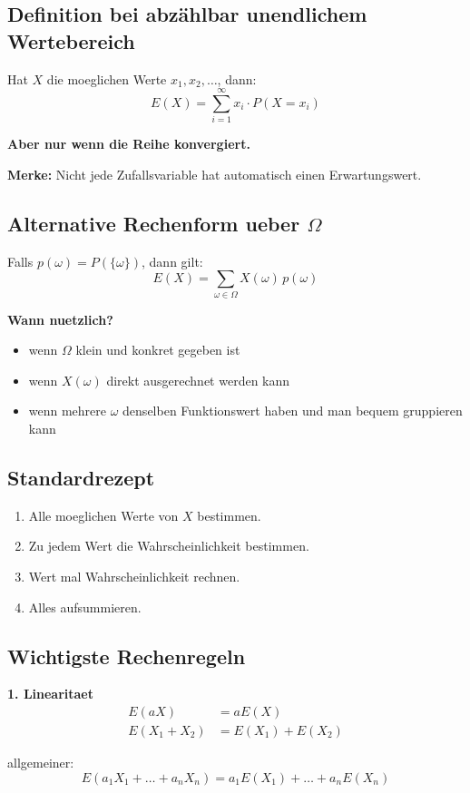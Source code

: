 \documentclass[a4paper,11pt]{article}
\begin{document}
\subsection{Definition bei abz\"ahlbar unendlichem Wertebereich}
Hat $X$ die moeglichen Werte $x_1,x_2,\dots$, dann:
\[
E(X)=\sum_{i=1}^\infty x_i \cdot P(X=x_i)
\]

\textbf{Aber nur wenn die Reihe konvergiert.}

\textbf{Merke:}
Nicht jede Zufallsvariable hat automatisch einen Erwartungswert.

\subsection{Alternative Rechenform ueber $\Omega$}
Falls $p(\omega)=P(\{\omega\})$, dann gilt:
\[
E(X)=\sum_{\omega \in \Omega} X(\omega)\,p(\omega)
\]

\textbf{Wann nuetzlich?}
\begin{itemize}
  \item wenn $\Omega$ klein und konkret gegeben ist
  \item wenn $X(\omega)$ direkt ausgerechnet werden kann
  \item wenn mehrere $\omega$ denselben Funktionswert haben und man bequem gruppieren kann
\end{itemize}

\subsection{Standardrezept}
\begin{enumerate}
  \item Alle moeglichen Werte von $X$ bestimmen.
  \item Zu jedem Wert die Wahrscheinlichkeit bestimmen.
  \item Wert mal Wahrscheinlichkeit rechnen.
  \item Alles aufsummieren.
\end{enumerate}

\subsection{Wichtigste Rechenregeln}
\textbf{1. Linearitaet}
\begin{align*}
E(aX) &= aE(X) \\
E(X_1+X_2) &= E(X_1)+E(X_2)
\end{align*}

allgemeiner:
\[
E(a_1X_1+\dots+a_nX_n)=a_1E(X_1)+\dots+a_nE(X_n)
\]
\end{document}
